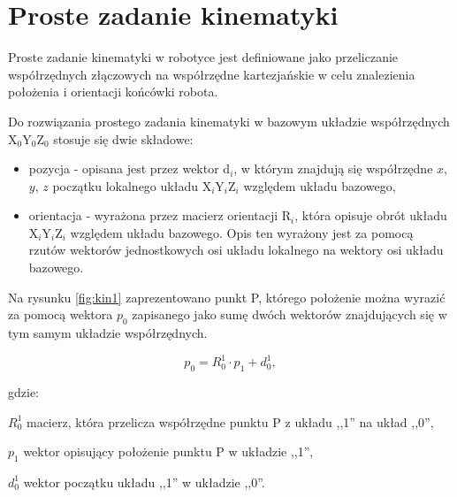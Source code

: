\section{Proste zadanie kinematyki}

Proste zadanie kinematyki w robotyce jest definiowane jako przeliczanie współrzędnych złączowych na współrzędne kartezjańskie w celu znalezienia położenia i orientacji końcówki robota.   



Do rozwiązania prostego zadania kinematyki w bazowym układzie współrzędnych X$_0$Y$_0$Z$_0$ stosuje się dwie składowe:

\begin{itemize}
	\item pozycja - opisana jest przez wektor d$_i$, w którym znajdują się współrzędne $x$, $y$, $z$ początku lokalnego układu X$_i$Y$_i$Z$_i$ względem układu bazowego,
	\item orientacja - wyrażona przez macierz orientacji R$_i$, która opisuje obrót układu X$_i$Y$_i$Z$_i$ względem układu bazowego. Opis ten wyrażony jest za pomocą rzutów wektorów jednostkowych osi układu lokalnego na wektory osi układu bazowego.  
\end{itemize}   


Na rysunku \ref{fig:kin1} zaprezentowano punkt P, którego położenie można wyrazić za pomocą  wektora $p_0$ zapisanego jako sumę dwóch wektorów znajdujących się w tym samym układzie współrzędnych.



\begin{equation}
p_{0} = R^{1}_{0} \cdot p_{1} + d^{1}_{0},
\end{equation}

gdzie: 

\begin{eqwhere}[2cm]
	\item[$R^{1}_{0}$] macierz, która przelicza współrzędne punktu P z układu ,,1'' na układ ,,0'',
	\item[$p_{1}$] wektor opisujący położenie punktu P w układzie ,,1'',
	\item[$d^{1}_{0}$] wektor początku układu ,,1'' w układzie ,,0''.
\end{eqwhere}


